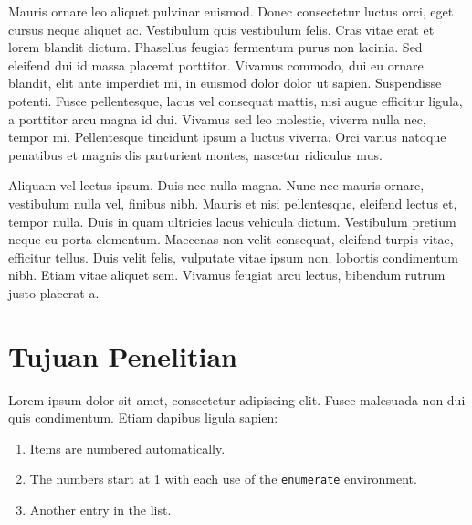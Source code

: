     Mauris ornare leo aliquet pulvinar euismod. Donec consectetur luctus orci, eget cursus neque aliquet ac. Vestibulum quis vestibulum felis. Cras vitae erat et lorem blandit dictum. Phasellus feugiat fermentum purus non lacinia. Sed eleifend dui id massa placerat porttitor. Vivamus commodo, dui eu ornare blandit, elit ante imperdiet mi, in euismod dolor dolor ut sapien. Suspendisse potenti. Fusce pellentesque, lacus vel consequat mattis, nisi augue efficitur ligula, a porttitor arcu magna id dui. Vivamus sed leo molestie, viverra nulla nec, tempor mi. Pellentesque tincidunt ipsum a luctus viverra. Orci varius natoque penatibus et magnis dis parturient montes, nascetur ridiculus mus.\par

    Aliquam vel lectus ipsum. Duis nec nulla magna. Nunc nec mauris ornare, vestibulum nulla vel, finibus nibh. Mauris et nisi pellentesque, eleifend lectus et, tempor nulla. Duis in quam ultricies lacus vehicula dictum. Vestibulum pretium neque eu porta elementum. Maecenas non velit consequat, eleifend turpis vitae, efficitur tellus. Duis velit felis, vulputate vitae ipsum non, lobortis condimentum nibh. Etiam vitae aliquet sem. Vivamus feugiat arcu lectus, bibendum rutrum justo placerat a.\\

\section{Tujuan Penelitian}
    Lorem ipsum dolor sit amet, consectetur adipiscing elit. Fusce malesuada non dui quis condimentum. Etiam dapibus ligula sapien:
    \begin{enumerate}
        \item Items are numbered automatically.
        \item The numbers start at 1 with each use of the \texttt{enumerate} environment.
        \item Another entry in the list.
    \end{enumerate} 
    
